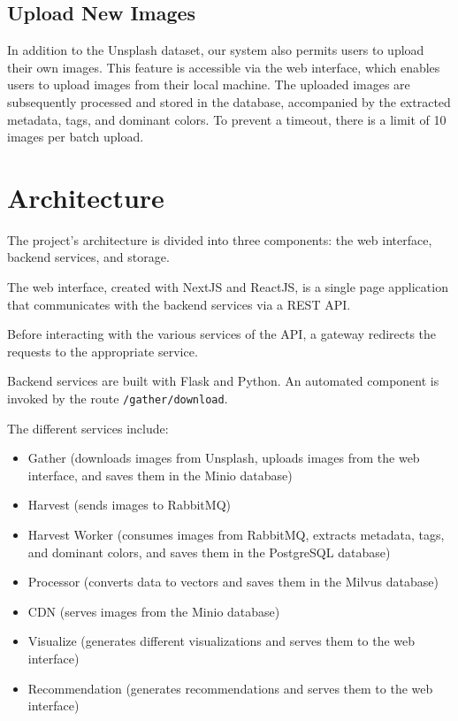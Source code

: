 \documentclass{article}
\begin{document}
    \subsection{Upload New Images}\label{subsec:upload_images}
    In addition to the Unsplash dataset, our system also permits users to upload their own images. This feature is accessible via the web interface, which enables users to upload images from their local machine. The uploaded images are subsequently processed and stored in the database, accompanied by the extracted metadata, tags, and dominant colors. To prevent a timeout, there is a limit of 10 images per batch upload.


    \section{Architecture}\label{sec:architecture}

    The project's architecture is divided into three components: the web interface, backend services, and storage.

    The web interface, created with NextJS and ReactJS, is a single page application that communicates with the backend services via a REST API.

    Before interacting with the various services of the API, a gateway redirects the requests to the appropriate service.

    Backend services are built with Flask and Python. An automated component is invoked by the route \texttt{/gather/download}.

    The different services include:
    \begin{itemize}
        \item Gather (downloads images from Unsplash, uploads images from the web interface, and saves them in the Minio database)
        \item Harvest (sends images to RabbitMQ)
        \item Harvest Worker (consumes images from RabbitMQ, extracts metadata, tags, and dominant colors, and saves them in the PostgreSQL database)
        \item Processor (converts data to vectors and saves them in the Milvus database)
        \item CDN (serves images from the Minio database)
        \item Visualize (generates different visualizations and serves them to the web interface)
        \item Recommendation (generates recommendations and serves them to the web interface)
    \end{itemize}
\end{document}

